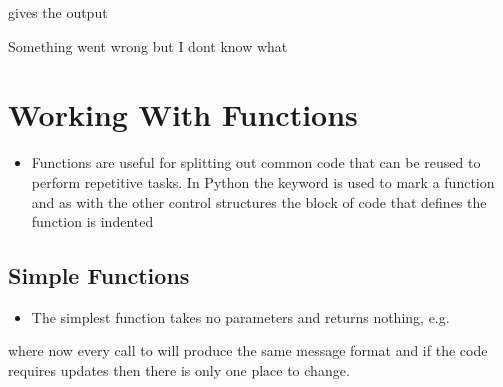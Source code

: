 \documentclass[letterpaper,10pt,english,openany]{sphinxmanual}
\begin{document}
gives the output

\begin{sphinxVerbatim}[commandchars=\\\{\}]
Something went wrong but I don\PYGZsq{}t know what
\end{sphinxVerbatim}



\section{Working With Functions}
\label{\detokenize{introduction_to_python/working_with_functions:working-with-functions}}\label{\detokenize{introduction_to_python/working_with_functions:id1}}\label{\detokenize{introduction_to_python/working_with_functions::doc}}\begin{itemize}
\item {} 
Functions are useful for splitting out common code that can be reused
to perform repetitive tasks. In Python the keyword  is used to
mark a function and as with the other control structures the block of
code that defines the function is indented

\end{itemize}


\subsection{Simple Functions}
\label{\detokenize{introduction_to_python/working_with_functions:simple-functions}}\begin{itemize}
\item {} 
The simplest function takes no parameters and returns nothing, e.g.

\end{itemize}

\begin{sphinxVerbatim}[commandchars=\\\{\}]
 
\end{sphinxVerbatim}

where now every call to  will produce the same message
format and if the code requires updates then there is only one place to
change.
\end{document}
